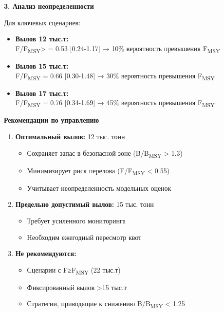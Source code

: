 \documentclass[
  letterpaper,
  DIV=11,
  numbers=noendperiod]{scrreprt}
\providecommand{\tightlist}{%
  \setlength{\itemsep}{0pt}\setlength{\parskip}{0pt}}
\begin{document}
\textbf{3. Анализ неопределенности}

Для ключевых сценариев:

\begin{itemize}
\item
  \textbf{Вылов 12 тыс.т:}\\
  F/F\textsubscript{MSY}\textgreater{} = 0.53 {[}0.24-1.17{]} → 10\%
  вероятность превышения F\textsubscript{MSY}
\item
  \textbf{Вылов 15 тыс.т:}\\
  F/F\textsubscript{MSY} = 0.66 {[}0.30-1.48{]} → 30\% вероятность
  превышения F\textsubscript{MSY}
\item
  \textbf{Вылов 17 тыс.т:}\\
  F/F\textsubscript{MSY} = 0.76 {[}0.34-1.69{]} → 45\% вероятность
  превышения F\textsubscript{MSY}
\end{itemize}

\textbf{Рекомендации по управлению}

\begin{enumerate}
\def\labelenumi{\arabic{enumi}.}
\tightlist
\item
  \textbf{Оптимальный вылов:} 12 тыс. тонн

  \begin{itemize}
  \tightlist
  \item
    Сохраняет запас в безопасной зоне (B/B\textsubscript{MSY}
    \textgreater{} 1.3)
  \item
    Минимизирует риск перелова (F/F\textsubscript{MSY} \textless{} 0.55)
  \item
    Учитывает неопределенность модельных оценок
  \end{itemize}
\item
  \textbf{Предельно допустимый вылов:} 15 тыс. тонн

  \begin{itemize}
  \tightlist
  \item
    Требует усиленного мониторинга
  \item
    Необходим ежегодный пересмотр квот
  \end{itemize}
\item
  \textbf{Не рекомендуются:}

  \begin{itemize}
  \tightlist
  \item
    Сценарии с F≥F\textsubscript{MSY} (22 тыс.т)
  \item
    Фиксированный вылов \textgreater15 тыс.т
  \item
    Стратегии, приводящие к снижению B/B\textsubscript{MSY} \textless{}
    1.25
  \end{itemize}
\end{enumerate}
\end{document}
